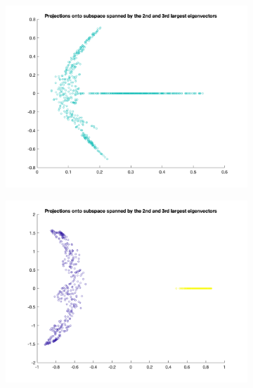 \documentclass[a4paper, 11pt, one column]{article}
\begin{document}
\begin{figure}[]
		\begin{subfigure}{0.33\textwidth}
            \includegraphics[width=\linewidth]{images/untitled.png}
        \end{subfigure}\hfil
        \begin{subfigure}{0.33\textwidth}
            \includegraphics[width=\linewidth]{images/5.png}
        \end{subfigure}\hfil
        \begin{subfigure}{0.33\textwidth}

\end{subfigure}
\end{figure}
\end{document}
